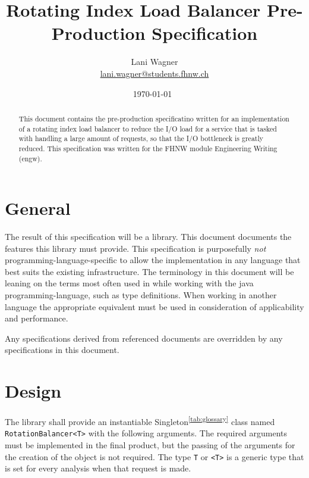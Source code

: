 \documentclass[11pt]{article} %
\title{Rotating Index Load Balancer Pre-Production Specification}
\author{Lani Wagner\\\href{mailto:lani.wagner@students.fhnw.ch}{lani.wagner@students.fhnw.ch}}
\date{\today\ \currenttime} %
\begin{document}
    \VerbatimFootnotes
    \clearpage\maketitle
    \thispagestyle{empty}
    \begin{abstract}
        This document contains the pre-production specificatino written for an implementation of a rotating index
        load balancer to reduce the I/O load for a service that is tasked with handling a large amount of requests,
        so that the I/O bottleneck is greatly reduced. This specification was written for the FHNW module Engineering
        Writing (engw).
    \end{abstract}
    {\hypersetup{hidelinks} \tableofcontents}
    \newpage



    \section{General}

    The result of this specification will be a library. This document documents the features this library must provide. This specification is purposefully \textit{not} programming-language-specific to allow the implementation in any language that best suits the existing infrastructure. The terminology in this document will be leaning on the terms most often used in while working with the java programming-language, such as type definitions. When working in another language the appropriate equivalent must be used in consideration of applicability and performance.

    Any specifications derived from referenced documents are overridden by any specifications in this document.



    \section{Design}

    The library shall provide an instantiable Singleton\textsuperscript{\ref{tab:glossary}} class named
    \verb|RotationBalancer<T>| with the following arguments. The required arguments must be implemented in the final
    product, but the passing of the arguments for the creation of the object is not required. The type \verb|T| or
    \verb|<T>| is a generic type that is set for every analysis when that request is made.
\end{document}

